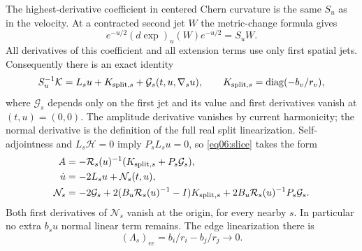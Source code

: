 \documentclass[11pt]{amsart}
\theoremstyle{definition}
\theoremstyle{remark}
\newcommand{\HH}{\mathcal H}
\newcommand{\cK}{\mathcal K}
\newcommand{\diag}{\operatorname{diag}}
\begin{document}
The highest-derivative coefficient in centered Chern curvature is
the same \(S_u\) as in the velocity. At a contracted second jet
\(W\) the metric-change formula gives
\[
 e^{-u/2}(d\exp)_u(W)e^{-u/2}=S_uW.
\]
All derivatives of this coefficient and all extension terms use
only first spatial jets. Consequently there is an exact identity
\begin{equation}\label{eq06:principal}
 S_u^{-1}\cK=L_su+K_{{\rm split},s}
                  +\mathcal G_s(t,u,\nabla_su),\qquad
 K_{{\rm split},s}=\diag(-b_v/r_v),
\end{equation}
where \(\mathcal G_s\) depends only on the first jet and its value
and first derivatives vanish at \((t,u)=(0,0)\). The amplitude
derivative vanishes by current harmonicity; the normal derivative
is the definition of the full real split linearization.
Self-adjointness and \(L_s\HH=0\) imply \(P_sL_su=0\), so
\eqref{eq06:slice} takes the form
\begin{equation}\label{eq06:semilinear}
 \begin{aligned}
 A&=-\mathcal R_s(u)^{-1}(K_{{\rm split},s}+P_s\mathcal G_s),\\
 \dot u&=-2L_su+\mathcal N_s(t,u),\\
 \mathcal N_s&=-2\mathcal G_s
 +2(B_u\mathcal R_s(u)^{-1}-I)K_{{\rm split},s}
 +2B_u\mathcal R_s(u)^{-1}P_s\mathcal G_s.
 \end{aligned}
\end{equation}
Both first derivatives of \(\mathcal N_s\) vanish at the origin,
for every nearby \(s\). In particular no extra \(b_su\) normal
linear term remains. The edge linearization there is
\begin{equation}\label{eq06:edgelinear}
 (\Lambda_s)_{ee}=b_i/r_i-b_j/r_j\longrightarrow0.
\end{equation}
\end{document}
